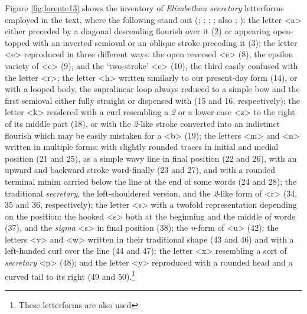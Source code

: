 \begin{paper}
Figure \ref{fig:lorente13} shows the inventory of \emph{Elizabethan secretary}
letterforms employed in the text, where the following stand out (\cite[202--205]{byrne_elizabethan_1925}; \cite[27--91]{tannenbaum_handwriting_1930}; \cite[13--16]{dawson_elizabethan_1966}; \cite[17]{petti_english_1977}; also \cite{preston_english_1999}; \cite{beal_dictionary_2008}): the
letter \textless a\textgreater{} either preceded by a diagonal
descending flourish over it (2) or appearing open-topped with an
inverted semioval or an oblique stroke preceding it (3); the letter
\textless e\textgreater{} reproduced in three different ways: the open
reversed \textless e\textgreater{} (8), the epsilon variety of
\textless e\textgreater{} (9), and the `two-stroke'
\textless e\textgreater{} (10), the third easily confused with the
letter \textless r\textgreater; the letter \textless h\textgreater{}
written similarly to our present-day form (14), or with a looped body,
the supralinear loop always reduced to a simple bow and the first
semioval either fully straight or dispensed with (15 and 16,
respectively); the letter \textless k\textgreater{} rendered with a curl
resembling a \emph{2} or a lower-case \textless z\textgreater{} to the
right of its middle part (18), or with the \emph{2}-like stroke
converted into an indistinct flourish which may be easily mistaken for a
\textless b\textgreater{} (19); the letters \textless m\textgreater{}
and \textless n\textgreater{} written in multiple forms: with slightly
rounded traces in initial and medial position (21 and 25), as a simple
wavy line in final position (22 and 26), with an upward and backward
stroke word-finally (23 and 27), and with a rounded terminal minim
carried below the line at the end of some words (24 and 28); the
traditional \emph{secretary}, the left-shouldered version, and the
\emph{2}-like form of \textless r\textgreater{} (34, 35 and 36,
respectively); the letter \textless s\textgreater{} with a twofold
representation depending on the position: the hooked
\textless s\textgreater{} both at the beginning and the middle of words
(37), and the \emph{sigma} \textless s\textgreater{} in final position
(38); the \emph{n}-form of \textless u\textgreater{} (42); the letters
\textless v\textgreater{} and \textless w\textgreater{} written in their
traditional shape (43 and 46) and with a left-handed curl over the line
(44 and 47); the letter \textless x\textgreater{} resembling a sort of
\emph{secretary} \textless p\textgreater{} (48); and the letter
\textless y\textgreater{} reproduced with a rounded head and a curved
tail to its right (49 and 50).\footnote{These letterforms are also used
}
\end{paper}
